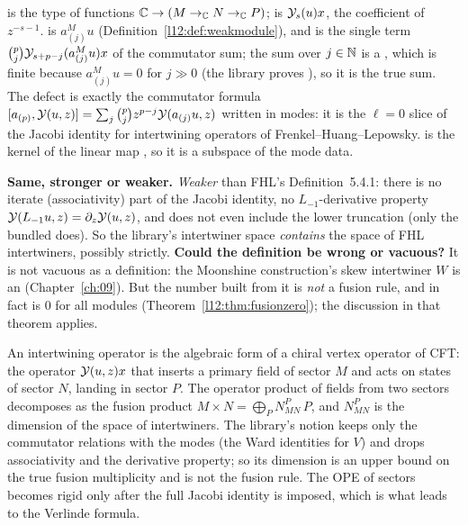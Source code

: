 \begin{dictionary}
 is the type of functions ${\mathbb{C}}\to(M\to_{{\mathbb{C}}}N\to_{{\mathbb{C}}}P)$;  is $\mathcal{Y}_s(u)x$, the
coefficient of $z^{-s-1}$.  is $a^M_{(j)}u$ (Definition~\ref{l12:def:weakmodule}), and
 is the single term $\binom pj\mathcal{Y}_{s+p-j}(a^M_{(j)}u)x$ of the commutator sum; the sum over $j\in{\mathbb{N}}$ is a
, which is finite because $a^M_{(j)}u = 0$ for $j\gg0$ (the library proves
), so it is the true sum. The defect is exactly the commutator formula
$[a_{(p)},\mathcal{Y}(u,z)] = \sum_j\binom pj z^{p-j}\mathcal{Y}(a_{(j)}u,z)$ written in modes: it is the $\ell=0$ slice of the Jacobi
identity for intertwining operators of Frenkel--Huang--Lepowsky.  is the kernel of the linear map
, so it is a subspace of the mode data.

\textbf{Same, stronger or weaker.} \emph{Weaker} than FHL's Definition~5.4.1: there is no iterate (associativity) part of the Jacobi
identity, no $L_{-1}$-derivative property $\mathcal{Y}(L_{-1}u,z) = \partial_z\mathcal{Y}(u,z)$, and  does not
even include the lower truncation (only the bundled  does). So the library's intertwiner space \emph{contains} the space
of FHL intertwiners, possibly strictly. \textbf{Could the definition be wrong or vacuous?} It is not vacuous as a definition: the Moonshine
construction's skew intertwiner $W$ is an  (Chapter~\ref{ch:09}). But the number  built from it is
\emph{not} a fusion rule, and in fact is $0$ for all modules (Theorem~\ref{l12:thm:fusionzero}); the discussion in that theorem applies.
\end{dictionary}

\begin{physics}
An intertwining operator is the algebraic form of a chiral vertex operator of CFT: the operator $\mathcal{Y}(u,z)x$ that inserts a primary field
of sector $M$ and acts on states of sector $N$, landing in sector $P$. The operator product of fields from two sectors
decomposes as the fusion product $M\times N = \bigoplus_PN_{MN}^P\,P$, and $N^P_{MN}$ is the dimension of the space of intertwiners. The library's notion
keeps only the commutator relations with the modes (the Ward identities for $V$) and drops associativity and the derivative property; so
its dimension is an upper bound on the true fusion multiplicity and is not the fusion rule. The OPE of sectors becomes rigid only
after the full Jacobi identity is imposed, which is what leads to the Verlinde formula.
\end{physics}

